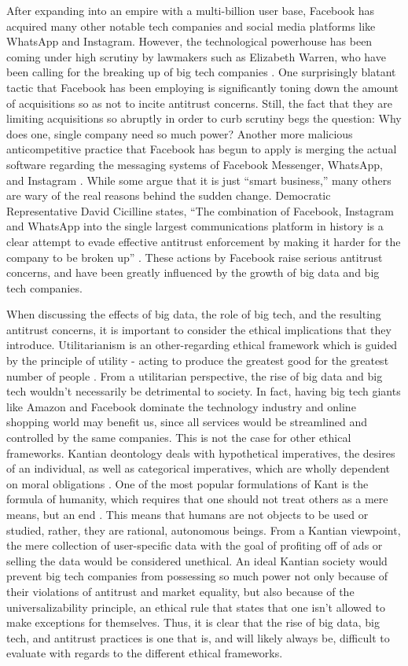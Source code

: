 \documentclass[twoside]{article}
\begin{document}
After expanding into an empire with a multi-billion user base, Facebook has acquired many other notable tech companies and social media platforms like WhatsApp and Instagram. However, the technological powerhouse has been coming under high scrutiny by lawmakers such as Elizabeth Warren, who have been calling for the breaking up of big tech companies \cite{facebook}. One surprisingly blatant tactic that Facebook has been employing is significantly toning down the amount of acquisitions so as not to incite antitrust concerns. Still, the fact that they are limiting acquisitions so abruptly in order to curb scrutiny begs the question: Why does one, single company need so much power? Another more malicious anticompetitive practice that Facebook has begun to apply is merging the actual software regarding the messaging systems of Facebook Messenger, WhatsApp, and Instagram \cite{facebook}. While some argue that it is just “smart business,” many others are wary of the real reasons behind the sudden change. Democratic Representative David Cicilline states, “The combination of Facebook, Instagram and WhatsApp into the single largest communications platform in history is a clear attempt to evade effective antitrust enforcement by making it harder for the company to be broken up” \cite{facebook}. These actions by Facebook raise serious antitrust concerns, and have been greatly influenced by the growth of big data and big tech companies.

When discussing the effects of big data, the role of big tech, and the resulting antitrust concerns, it is important to consider the ethical implications that they introduce. Utilitarianism is an other-regarding ethical framework which is guided by the principle of utility - acting to produce the greatest good for the greatest number of people \cite{crashcourse2}. From a utilitarian perspective, the rise of big data and big tech wouldn’t necessarily be detrimental to society. In fact, having big tech giants like Amazon and Facebook dominate the technology industry and online shopping world may benefit us, since all services would be streamlined and controlled by the same companies. This is not the case for other ethical frameworks. Kantian deontology deals with hypothetical imperatives, the desires of an individual, as well as categorical imperatives, which are wholly dependent on moral obligations \cite{crashcourse1}. One of the most popular formulations of Kant is the formula of humanity, which requires that one should not treat others as a mere means, but an end \cite{crashcourse1}. This means that humans are not objects to be used or studied, rather, they are rational, autonomous beings. From a Kantian viewpoint, the mere collection of user-specific data with the goal of profiting off of ads or selling the data would be considered unethical. An ideal Kantian society would prevent big tech companies from possessing so much power not only because of their violations of antitrust and market equality, but also because of the universalizability principle, an ethical rule that states that one isn’t allowed to make exceptions for themselves. Thus, it is clear that the rise of big data, big tech, and antitrust practices is one that is, and will likely always be, difficult to evaluate with regards to the different ethical frameworks.
\end{document}
